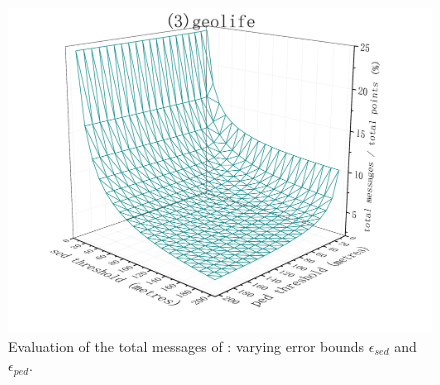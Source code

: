 \begin{figure}[tb!]
	\includegraphics[scale = 0.565]{figures/Fig-BITT-geolife-total-messages.png}\hspace{1ex}
	\vspace{-2ex}
	\caption{\small Evaluation of the total messages of \bitt: varying error bounds $\epsilon_{sed}$ and $\epsilon_{ped}$.}
	\label{fig:bitt-total-message}
	\vspace{-1ex}
\end{figure}




